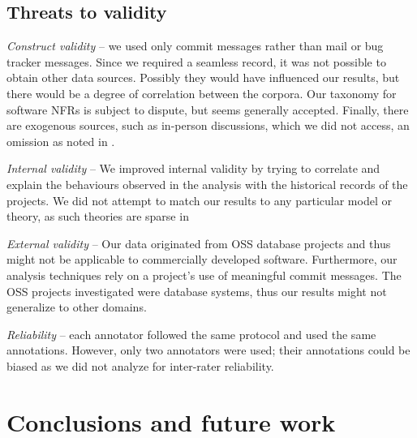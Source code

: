 \documentclass[]{sig-alternate}
\begin{document}
\subsection{Threats to validity}


\emph{Construct validity} -- we used only commit messages rather than mail or bug tracker messages. Since we required a seamless record, it was not possible to obtain other data sources. Possibly they would have influenced our results, but there would be a degree of correlation between the corpora.
Our taxonomy for software NFRs is subject to dispute, but seems generally accepted. Finally, there are exogenous sources, such as in-person discussions, which we did not access, an omission as noted in \cite{aranda09icse}. %

\emph{Internal validity} -- %
We improved internal validity by trying to correlate and explain the behaviours observed in the analysis with the historical records of the projects.
We did not attempt to match our results to any particular model or theory, as such theories are sparse in 

\emph{External validity} -- %
Our data originated from OSS database projects and thus might not be applicable to commercially developed software. 
Furthermore, our analysis techniques rely on a project's use of meaningful commit messages. The OSS projects investigated were database systems, thus 
our results might not generalize to other domains. %

\emph{Reliability} -- each annotator followed the same protocol and used the same annotations. 
However, only two annotators were used; their annotations could be biased as we did not analyze for inter-rater reliability.


\section{Conclusions and future work}
\end{document}
